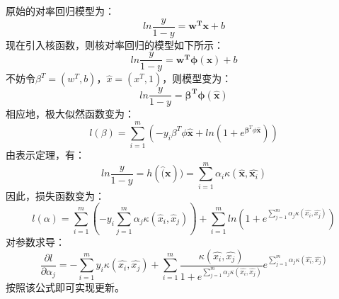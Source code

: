 \documentclass{ctexart}
\begin{document}
    \answer[6.9]
原始的对率回归模型为：
$$
ln\frac{y}{1-y} = \boldsymbol{w^Tx}+b
$$
现在引入核函数，则核对率回归的模型如下所示：
$$
ln\frac{y}{1-y} = \boldsymbol{w^T\phi (x)}+b
$$
不妨令$\beta^T = (w^T, b)$，$\hat{x}=(x^T , 1)$，则模型变为：
$$
ln\frac{y}{1-y} = \boldsymbol{\beta^T\phi (\hat{x})}
$$
相应地，极大似然函数变为：
$$
l(\beta) = \sum_{i=1}^{m}(-y_i\beta^T\phi{\hat{\boldsymbol{x}}}+ln(1+e^{\boldsymbol{\beta}^T\phi \hat{\boldsymbol{x}}}))
$$
由表示定理，有：
$$
ln\frac{y}{1-y}=h(\hat(\boldsymbol{x}))=\sum_{i=1}^m\alpha_i\kappa(\hat{\boldsymbol{x}},\hat{\boldsymbol{x}_i}) 
$$
因此，损失函数变为：
$$
l(\alpha)=\sum_{i=1}^m(-y_i\sum_{j=1}^m\alpha_j\kappa(\hat{x}_i,\hat{x}_j))
+\sum_{i=1}^m ln(1+e^{\sum_{j=1}^m\alpha_j\kappa(\hat{x_i},\hat{x_j})})
$$
对参数求导：
$$
\frac{\partial l}{\partial \alpha_j}=-\sum_{i=1}^m y_i\kappa(\hat{x_i},\hat{x_j})
+\sum_{i=1}^m\frac{\kappa(\hat{x_i},\hat{x_j})}{1+e^{\sum_{j=1}^m \alpha_j\kappa(\hat{x_i},\hat{x_j})}}
e^{\sum_{j=1}^m \alpha_j\kappa(\hat{x_i},\hat{x_j})}
$$
按照该公式即可实现更新。
\end{document}
